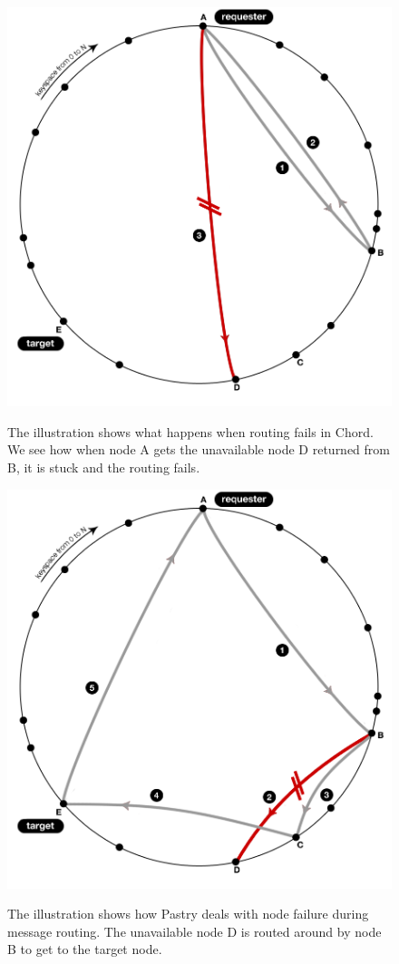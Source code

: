\begin{figure}[!h]
\begin{center}
  \label{figChordFailedLookup}
  \includegraphics[width=0.9\linewidth]{illustrations/ChordRoutingFailed.png}
  \caption{The illustration shows what happens when routing fails in Chord. We see how when node A gets the unavailable node D returned from B, it is stuck and the routing fails.}
\end{center}
\end{figure}

\begin{figure}[!h]
\begin{center}
  \label{figPastryFailedLookip}
  \includegraphics[width=0.9\linewidth]{illustrations/PastryRoutingFailed.png}
  \caption{The illustration shows how Pastry deals with node failure during message routing. The unavailable node D is routed around by node B to get to the target node.}
\end{center}
\end{figure}


